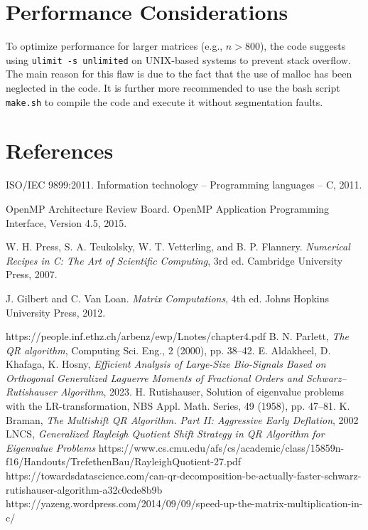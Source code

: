 \documentclass[12pt]{article}
\begin{document}
	\section{Performance Considerations}
	To optimize performance for larger matrices (e.g., $n > 800$), the code suggests using \texttt{ulimit -s unlimited} on UNIX-based systems to prevent stack overflow. The main reason for this flaw is due to the fact that the use of malloc has been neglected in the code. It is further more recommended to use the bash script \texttt{make.sh} to compile the code and execute it without segmentation faults.
		
	\section{References}
	\begin{thebibliography}{9}
		ISO/IEC 9899:2011. Information technology -- Programming languages -- C, 2011.
		
		OpenMP Architecture Review Board. OpenMP Application Programming Interface, Version 4.5, 2015.
		
		W. H. Press, S. A. Teukolsky, W. T. Vetterling, and B. P. Flannery. \textit{Numerical Recipes in C: The Art of Scientific Computing}, 3rd ed. Cambridge University Press, 2007.
		
		J. Gilbert and C. Van Loan. \textit{Matrix Computations}, 4th ed. Johns Hopkins University Press, 2012.
		
		 https://people.inf.ethz.ch/arbenz/ewp/Lnotes/chapter4.pdf 
		 B. N. Parlett, \textit{The QR algorithm}, Computing Sci. Eng., 2 (2000), pp. 38–42.
		 E. Aldakheel, D. Khafaga, K. Hosny, \textit{Efficient Analysis of Large-Size Bio-Signals Based on Orthogonal Generalized Laguerre Moments of Fractional Orders and Schwarz–Rutishauser Algorithm}, 2023.
		 H. Rutishauser, Solution of eigenvalue problems with the LR-transformation, NBS
		Appl. Math. Series, 49 (1958), pp. 47–81.
		 K. Braman, \textit{The Multishift QR Algorithm. Part II: Aggressive Early Deflation}, 2002
		 LNCS, \textit{Generalized Rayleigh Quotient Shift Strategy in QR Algorithm for Eigenvalue Problems}
		 https://www.cs.cmu.edu/afs/cs/academic/class/15859n-f16/Handouts/TrefethenBau/RayleighQuotient-27.pdf
		 https://towardsdatascience.com/can-qr-decomposition-be-actually-faster-schwarz-rutishauser-algorithm-a32c0cde8b9b
		 https://yazeng.wordpress.com/2014/09/09/speed-up-the-matrix-multiplication-in-c/
	\end{thebibliography}
	
\end{document}
